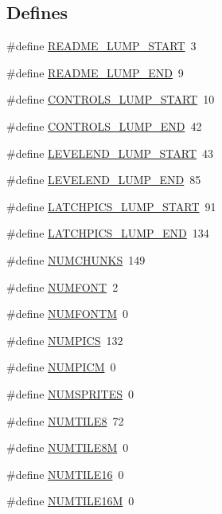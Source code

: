 \subsection*{Defines}
\begin{DoxyCompactItemize}
\item 
\#define \hyperlink{GFXV__WL6_8H_af1b7fca71ee9337c9dbf43d0949aa105}{README\_\-LUMP\_\-START}~3
\item 
\#define \hyperlink{GFXV__WL6_8H_aecaa7957af595ae525e60cc37dfcf3da}{README\_\-LUMP\_\-END}~9
\item 
\#define \hyperlink{GFXV__WL6_8H_adc808f8c4862206753bc6b22a20de529}{CONTROLS\_\-LUMP\_\-START}~10
\item 
\#define \hyperlink{GFXV__WL6_8H_a227d962ff8d8d1d9a0f31a2d7b35f04d}{CONTROLS\_\-LUMP\_\-END}~42
\item 
\#define \hyperlink{GFXV__WL6_8H_a1895eb960cb12bb7b49bf322e79d6c80}{LEVELEND\_\-LUMP\_\-START}~43
\item 
\#define \hyperlink{GFXV__WL6_8H_a01e5f4d5f8e05beb4315b9ad907e06e7}{LEVELEND\_\-LUMP\_\-END}~85
\item 
\#define \hyperlink{GFXV__WL6_8H_a88207d485bad504249067e714794e823}{LATCHPICS\_\-LUMP\_\-START}~91
\item 
\#define \hyperlink{GFXV__WL6_8H_a366d7af9e92d0a7d4ee631d44c4ecbf7}{LATCHPICS\_\-LUMP\_\-END}~134
\item 
\#define \hyperlink{GFXV__WL6_8H_a06c8b188cc3cdd25a5451beeefddfa66}{NUMCHUNKS}~149
\item 
\#define \hyperlink{GFXV__WL6_8H_a7686ac8ed1dbf71ebee2b4711dae0edd}{NUMFONT}~2
\item 
\#define \hyperlink{GFXV__WL6_8H_afd7a523b060f425fd737a94c044892ac}{NUMFONTM}~0
\item 
\#define \hyperlink{GFXV__WL6_8H_a437727f0f1480aff6a1437f8881e2241}{NUMPICS}~132
\item 
\#define \hyperlink{GFXV__WL6_8H_a2eb878497ab6b2a4f80015a218f38c8f}{NUMPICM}~0
\item 
\#define \hyperlink{GFXV__WL6_8H_ac7e5f97c96cc0101c6f998c7010813a3}{NUMSPRITES}~0
\item 
\#define \hyperlink{GFXV__WL6_8H_a1ad83311a1b6300dcac06636eb1d03b4}{NUMTILE8}~72
\item 
\#define \hyperlink{GFXV__WL6_8H_a99d75e9d203bae79464f2ecd3fd31b8d}{NUMTILE8M}~0
\item 
\#define \hyperlink{GFXV__WL6_8H_a64d23288f15517babe845b31bebdf108}{NUMTILE16}~0
\item 
\#define \hyperlink{GFXV__WL6_8H_a80bd5aa78c52471ba88d9d15baeb5e44}{NUMTILE16M}~0

\end{DoxyCompactItemize}
